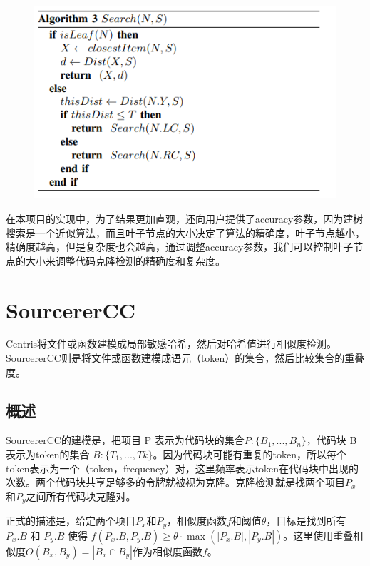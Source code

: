 \documentclass{cjc}
\begin{document}
\begin{figure}[htb]
  \centering
  \includegraphics[width=\linewidth]{pics/image-20220622213044543.png}
\end{figure}


在本项目的实现中，为了结果更加直观，还向用户提供了accuracy参数，因为建树搜索是一个近似算法，而且叶子节点的大小决定了算法的精确度，叶子节点越小，精确度越高，但是复杂度也会越高，通过调整accuracy参数，我们可以控制叶子节点的大小来调整代码克隆检测的精确度和复杂度。

\section{SourcererCC}

Centris将文件或函数建模成局部敏感哈希，然后对哈希值进行相似度检测。SourcererCC则是将文件或函数建模成语元（token）的集合，然后比较集合的重叠度。

\subsection{概述}

SourcererCC的建模是，把项目 P 表示为代码块的集合$P:\{B_1,...,B_n\}$，代码块 B 表示为token的集合 $B:\{T_1,...,Tk\}$。因为代码块可能有重复的token，所以每个token表示为一个（token，frequency）对，这里频率表示token在代码块中出现的次数。两个代码块共享足够多的令牌就被视为克隆。克隆检测就是找两个项目$P_x$和$P_y$之间所有代码块克隆对。

正式的描述是，给定两个项目$P_x$和$P_y$，相似度函数$f$和阈值$θ$，目标是找到所有$P_x.B$ 和 $P_y.B$ 使得 $f(P_x.B, P_y .B) ≥ θ · \max(|P_x .B|, |P_y .B|)$。这里使用重叠相似度$O(B_x,B_y)=|B_x\cap B_y|$作为相似度函数$f$。
\end{document}
